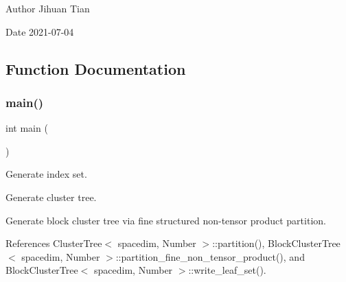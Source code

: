 \begin{DoxyAuthor}{Author}
Jihuan Tian 
\end{DoxyAuthor}
\begin{DoxyDate}{Date}
2021-\/07-\/04 
\end{DoxyDate}


\subsection{Function Documentation}
\mbox{\label{bct-visualize-with-rank_8cc_ae66f6b31b5ad750f1fe042a706a4e3d4}} 
\subsubsection{\texorpdfstring{main()}{main()}}
{\footnotesize\ttfamily int main (\begin{DoxyParamCaption}{ }\end{DoxyParamCaption})}

Generate index set.

Generate cluster tree.

Generate block cluster tree via fine structured non-\/tensor product partition.

References Cluster\+Tree$<$ spacedim, Number $>$\+::partition(), Block\+Cluster\+Tree$<$ spacedim, Number $>$\+::partition\+\_\+fine\+\_\+non\+\_\+tensor\+\_\+product(), and Block\+Cluster\+Tree$<$ spacedim, Number $>$\+::write\+\_\+leaf\+\_\+set().

